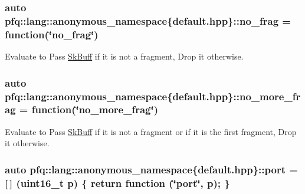\subsubsection[{\texorpdfstring{no\+\_\+frag}{no_frag}}]{\setlength{\rightskip}{0pt plus 5cm}auto pfq\+::lang\+::anonymous\+\_\+namespace\{default.\+hpp\}\+::no\+\_\+frag = {\bf function}(\char`\"{}no\+\_\+frag\char`\"{})}\hypertarget{namespacepfq_1_1lang_1_1anonymous__namespace_02default_8hpp_03_a4cfaf018f687a1563161b8f4245a6652}{}\label{namespacepfq_1_1lang_1_1anonymous__namespace_02default_8hpp_03_a4cfaf018f687a1563161b8f4245a6652}


Evaluate to {\ttfamily Pass} \hyperlink{structpfq_1_1lang_1_1SkBuff}{Sk\+Buff} if it is not a fragment, {\ttfamily Drop} it otherwise. 

\subsubsection[{\texorpdfstring{no\+\_\+more\+\_\+frag}{no_more_frag}}]{\setlength{\rightskip}{0pt plus 5cm}auto pfq\+::lang\+::anonymous\+\_\+namespace\{default.\+hpp\}\+::no\+\_\+more\+\_\+frag = {\bf function}(\char`\"{}no\+\_\+more\+\_\+frag\char`\"{})}\hypertarget{namespacepfq_1_1lang_1_1anonymous__namespace_02default_8hpp_03_a88628ce70e2a650af1338851373b9891}{}\label{namespacepfq_1_1lang_1_1anonymous__namespace_02default_8hpp_03_a88628ce70e2a650af1338851373b9891}


Evaluate to {\ttfamily Pass} \hyperlink{structpfq_1_1lang_1_1SkBuff}{Sk\+Buff} if it is not a fragment or if it is the first fragment, {\ttfamily Drop} it otherwise. 

\subsubsection[{\texorpdfstring{port}{port}}]{\setlength{\rightskip}{0pt plus 5cm}auto pfq\+::lang\+::anonymous\+\_\+namespace\{default.\+hpp\}\+::port = \mbox{[}$\,$\mbox{]} (uint16\+\_\+t p) \{ return {\bf function} (\char`\"{}port\char`\"{}, p); \}}\hypertarget{namespacepfq_1_1lang_1_1anonymous__namespace_02default_8hpp_03_a868eca03290a037cb4e9b7075085888b}{}\label{namespacepfq_1_1lang_1_1anonymous__namespace_02default_8hpp_03_a868eca03290a037cb4e9b7075085888b}


